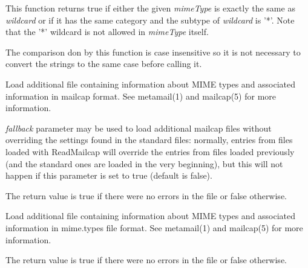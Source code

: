 
This function returns true if either the given {\it mimeType} is exactly the
same as {\it wildcard} or if it has the same category and the subtype of
{\it wildcard} is '*'. Note that the '*' wildcard is not allowed in
{\it mimeType} itself.

The comparison don by this function is case insensitive so it is not
necessary to convert the strings to the same case before calling it.


\label{wxmimetypesmanagerreadmailcap}


Load additional file containing information about MIME types and associated
information in mailcap format. See metamail(1) and mailcap(5) for more
information.

{\it fallback} parameter may be used to load additional mailcap files without
overriding the settings found in the standard files: normally, entries from
files loaded with ReadMailcap will override the entries from files loaded
previously (and the standard ones are loaded in the very beginning), but this
will not happen if this parameter is set to true (default is false).

The return value is true if there were no errors in the file or false
otherwise.


\label{wxmimetypesmanagerreadmimetypes}


Load additional file containing information about MIME types and associated
information in mime.types file format. See metamail(1) and mailcap(5) for more
information.

The return value is true if there were no errors in the file or false
otherwise.

